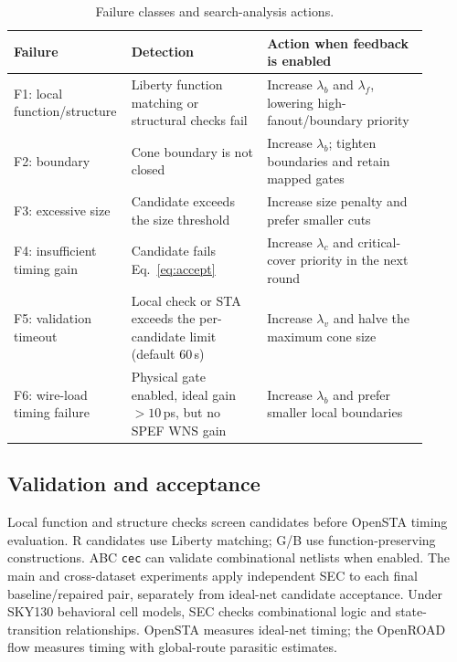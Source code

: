 \documentclass[preprint,12pt]{elsarticle}
\begin{document}
\begin{table}[htbp]\centering\footnotesize
\caption{Failure classes and search-analysis actions.}\label{tab:failures}
\begin{tabular}{p{0.20\linewidth}p{0.32\linewidth}p{0.38\linewidth}}\toprule
Failure & Detection & Action when feedback is enabled\\\midrule
F1: local function/structure & Liberty function matching or structural checks fail & Increase $\lambda_b$ and $\lambda_f$, lowering high-fanout/boundary priority\\
F2: boundary & Cone boundary is not closed & Increase $\lambda_b$; tighten boundaries and retain mapped gates\\
F3: excessive size & Candidate exceeds the size threshold & Increase size penalty and prefer smaller cuts\\
F4: insufficient timing gain & Candidate fails Eq.~\eqref{eq:accept} & Increase $\lambda_c$ and critical-cover priority in the next round\\
F5: validation timeout & Local check or STA exceeds the per-candidate limit (default 60\,s) & Increase $\lambda_v$ and halve the maximum cone size\\
F6: wire-load timing failure & Physical gate enabled, ideal gain $>10$\,ps, but no SPEF WNS gain & Increase $\lambda_b$ and prefer smaller local boundaries\\\bottomrule
\end{tabular}
\end{table}

\subsection{Validation and acceptance}\label{sec:validation}
Local function and structure checks screen candidates before OpenSTA timing evaluation. R candidates use Liberty matching; G/B use function-preserving constructions. ABC \texttt{cec} can validate combinational netlists when enabled. The main and cross-dataset experiments apply independent SEC to each final baseline/repaired pair, separately from ideal-net candidate acceptance. Under SKY130 behavioral cell models, SEC checks combinational logic and state-transition relationships. OpenSTA measures ideal-net timing; the OpenROAD flow measures timing with global-route parasitic estimates.
\end{document}

